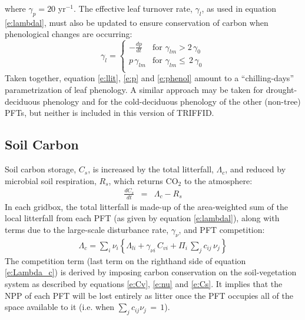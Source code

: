 \documentclass[a4paper]{article}
\begin{document}
where $\gamma_{p}=20$ yr$^{-1}$. The effective leaf turnover rate,
$\gamma_l$, as used in equation \eqref{e:lambdal}, must also be updated
to ensure conservation of carbon when phenological changes are
occurring:
\begin{equation}
\gamma_{l} = \left \{ \begin{array}{lll}
         - \displaystyle{\frac{dp}{dt}} & \mbox{for $\gamma_{lm} > 2 \,\gamma_{0}$}   \\ [5mm]
          p \, \gamma_{lm} & \mbox{for $\gamma_{lm} \leq \,2 \, \gamma_{0}$}   \\ [5mm]
             \end{array} \right.
\label{e:phenol}
\end{equation}
Taken together, equation \eqref{e:llit}, \eqref{e:p} and \eqref{e:phenol}
amount to a ``chilling-days'' parametrization of leaf phenology.  A
similar approach may be taken for drought-deciduous phenology and for
the cold-deciduous phenology of the other (non-tree) PFTs, but neither
is included in this version of TRIFFID.

\subsection{Soil Carbon}  \label{s:Cs}
Soil carbon storage, $C_s$, is increased by the total litterfall,
$\Lambda_c$, and reduced by microbial soil respiration, $R_s$, which
returns CO$_{2}$ to the atmosphere:
\begin{eqnarray}
\frac{d C_{s}}{dt} &=& \Lambda_{c} - R_{s}
\label{e:Cs}
\end{eqnarray}
In each gridbox, the total litterfall is made-up of the area-weighted
sum of the local litterfall from each PFT (as given by equation
\eqref{e:lambdal}), along with terms due to the large-scale disturbance
rate, $\gamma_{\nu}$, and PFT competition:
\begin{eqnarray}
\Lambda_{c} = \sum_{i} \nu_{i}
\left\{\Lambda_{li}+\gamma_{\nu i} \, C_{vi}+
\Pi_i \, \sum_{j} c_{ij} \, \nu_j \right\} 
\label{e:Lambda_c}
\end{eqnarray}
The competition term (last term on the righthand side of equation
\eqref{e:Lambda_c}) is derived by imposing carbon conservation on the
soil-vegetation system as described by equations \eqref{e:Cv},
\eqref{e:nu} and \eqref{e:Cs}. It implies that the NPP of each PFT will
be lost entirely as litter once the PFT occupies all of the space
available to it (i.e. when $\sum_j c_{ij} \nu_j \, = \, 1 $).
\end{document}

